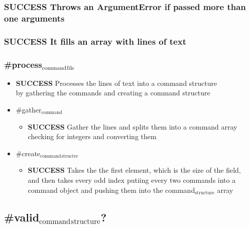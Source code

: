 \documentclass{article}
\begin{document}
\subsubsection{\textbf{SUCCESS} Throws an ArgumentError if passed more than one arguments}
\label{sec-4-1-2}
\subsubsection{\textbf{SUCCESS} It fills an array with lines of text}
\label{sec-4-1-3}
\subsubsection{\#process$_{\mathrm{command}}$$_{\mathrm{file}}$}
\label{sec-4-1-4}
\begin{itemize}

\item \textbf{SUCCESS} Processes the lines of text into a command structure\\
\label{sec-4-1-4-1}%
by gathering the commands and creating a command structure

\item \#gather$_{\mathrm{command}}$
\label{sec-4-1-4-2}%
\begin{itemize}

\item \textbf{SUCCESS} Gather the lines and splits them into a command array\\
\label{sec-4-1-4-2-1}%
checking for integers and converting them
\end{itemize} %

\item \#create$_{\mathrm{command}}$$_{\mathrm{structre}}$
\label{sec-4-1-4-3}%
\begin{itemize}

\item \textbf{SUCCESS} Takes the the first element, which is the size of the field,\\
\label{sec-4-1-4-3-1}%
and then takes every odd index
            putiing every two commands into a command object
            and pushing them into the command$_{\mathrm{structure}}$ array
\end{itemize} %
\end{itemize} %
\subsection{\#valid$_{\mathrm{command}}$$_{\mathrm{structure}}$?}
\label{sec-4-2}
\end{document}
